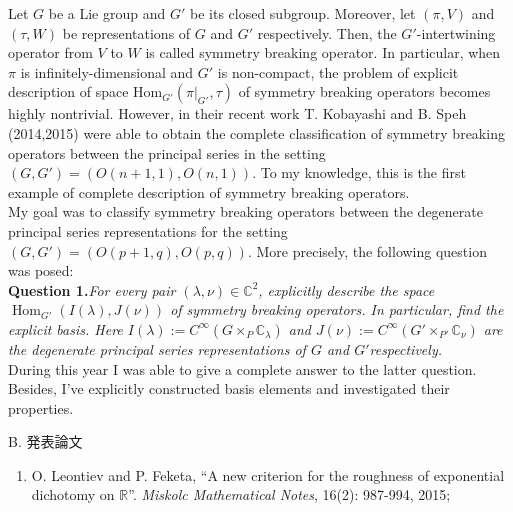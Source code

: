 \documentclass[a4j,twocolumn]{jarticle}
\begin{document}
\vspace{0.5cm}
Let $G$ be a Lie group and $G'$ be its closed subgroup. Moreover, let $(\pi,V)$ and $(\tau,W)$ be representations of $G$ and $G'$
respectively. Then, the $G'$-intertwining operator from $V$ to $W$ is called symmetry breaking operator. In particular, when 
$\pi$ is infinitely-dimensional and $G'$ is non-compact, the problem of explicit description of space
$\mbox{Hom}_{G'}(\pi\big|_{G'},\tau)$ of symmetry breaking operators becomes highly nontrivial. However, in their recent work 
T. Kobayashi and B. Speh (2014,2015) were able to obtain the complete classification of symmetry breaking operators between
the principal series in the setting $(G, G') = (O(n+1,1),O(n,1))$. To my knowledge, this is the first example of complete
description of symmetry breaking operators.\\
My goal was to classify symmetry breaking operators between the degenerate principal series representations for the setting
$(G, G') = (O(p+1,q),O(p,q))$. More precisely, the following question was posed:\\
{\noindent}\textbf{Question \textbf{1}.}{\itshape{For every pair $( \lambda, \nu) \in
\mathbb{C}^2$, explicitly describe the space
$\operatorname{Hom}_{G'}(I(\lambda),J(\nu))$ of symmetry breaking operators. In particular, find the explicit basis.
Here $I(\lambda):=C^{\infty}\left(  G\times_P\mathbb{C}_\lambda\right)$
and $J(\nu):=C^{\infty}\left( G'\times_{P'}\mathbb{C}_{\nu} \right)$ are the degenerate principal series representations of $G$ and
$G'$respectively.}}\\
During this year I was able to give a complete answer to the latter question. Besides, I've explicitly constructed basis
elements and investigated their properties.




\vspace{0.2cm}


\noindent
B. 発表論文
\begin{enumerate}
	\item O. Leontiev and P. Feketa, ``A new criterion for the roughness of exponential dichotomy on $\mathbb{R}$''. {\it
		Miskolc Mathematical Notes}, 16(2): 987-994, 2015;
\end{enumerate}

\vspace{0.1cm}
\end{document}
